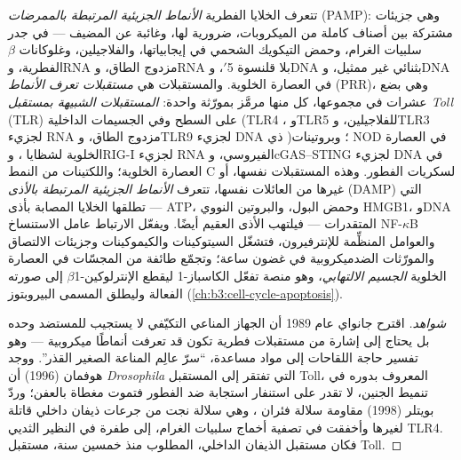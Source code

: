 \begin{definition}\label{def:b3:innate-immunity:prr}
تتعرف الخلايا الفطرية \emph{الأنماط الجزيئية المرتبطة
بالممرضات} (PAMP): وهي جزيئات مشتركة بين أصناف كاملة من
الميكروبات، ضرورية لها، وغائبة عن المضيف ---  في جدر سلبيات الغرام،  وحمض التيكويك
الشحمي في إيجابياتها، والفلاجيلين، وغلوكانات $\beta$
الفطرية، وRNA مزدوج الطاق، وRNA بلا قلنسوة 5$'$، وDNA بثنائي
 غير ممثيل، وDNA في العصارة الخلوية. والمستقبلات هي
\emph{مستقبلات تعرف الأنماط} (PRR)، وهي بضع عشرات في
مجموعها، كل منها مرمَّز بمورّثة واحدة: \emph{المستقبلات
الشبيهة بمستقبل Toll} (TLR) على السطح وفي الجسيمات الداخلية
(TLR4 ، وTLR5 للفلاجيلين، وTLR3 لجزيء
RNA مزدوج الطاق، وTLR9 لجزيء DNA ذي )؛ وبروتينات NOD في
العصارة الخلوية لشظايا ، وRIG-I لجزيء RNA
الفيروسي، وcGAS--STING لجزيء DNA في العصارة الخلوية؛
واللكتينات من النمط C لسكريات الفطور. وهذه المستقبلات
نفسها، أو غيرها من العائلات نفسها، تتعرف \emph{الأنماط
الجزيئية المرتبطة بالأذى} (DAMP) التي تطلقها الخلايا
المصابة بأذى --- ATP، وحمض البول، والبروتين النووي HMGB1،
وDNA المتقدرات --- فيلتهب الأذى العقيم أيضًا. ويفعّل
الارتباط عامل الاستنساخ NF-$\kappa$B والعوامل المنظِّمة
للإنترفيرون، فتشغّل السيتوكينات والكيموكينات وجزيئات
الالتصاق والمورّثات الضدميكروبية في غضون ساعة؛ وتجمّع طائفة
من المجسّات في العصارة الخلوية \emph{الجسيم الالتهابي}، وهو
منصة تفعّل الكاسباز-1 ليقطع الإنترلوكين-1$\beta$ إلى صورته
الفعالة وليطلق  المسمى البيروبتوز
(\cref{ch:b3:cell-cycle-apoptosis}).
\end{definition}

\begin{proof}[شواهد]
اقترح جانواي عام 1989 أن الجهاز المناعي التكيّفي لا يستجيب
للمستضد وحده بل يحتاج إلى إشارة من مستقبلات فطرية تكون قد
تعرفت أنماطًا ميكروبية --- وهو تفسير حاجة اللقاحات إلى مواد
مساعدة، ``سرّ عالِم المناعة الصغير القذر''. ووجد هوفمان
(1996) أن \emph{Drosophila} التي تفتقر إلى المستقبل Toll،
المعروف بدوره في تنميط الجنين، لا تقدر على استنفار استجابة
ضد الفطور فتموت مغطاة بالعفن؛ وردّ بويتلر (1998) مقاومة
سلالة فئران ، وهي سلالة نجت من جرعات
ذيفان داخلي قاتلة لغيرها وأخفقت في تصفية أخماج سلبيات
الغرام، إلى طفرة في النظير الثديي TLR4. فكان مستقبل الذيفان
الداخلي، المطلوب منذ خمسين سنة، مستقبل Toll.
\end{proof}

